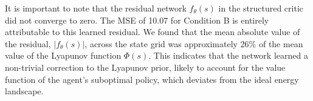 \documentclass[]{article}
\begin{document}
It is important to note that the residual network $f_\theta(s)$ in the structured critic did not converge to zero. The MSE of 10.07 for Condition B is entirely attributable to this learned residual. We found that the mean absolute value of the residual, $|f_\theta(s)|$, across the state grid was approximately 26\% of the mean value of the Lyapunov function $\Phi(s)$. This indicates that the network learned a non-trivial correction to the Lyapunov prior, likely to account for the value function of the agent's suboptimal policy, which deviates from the ideal energy landscape.
\end{document}
